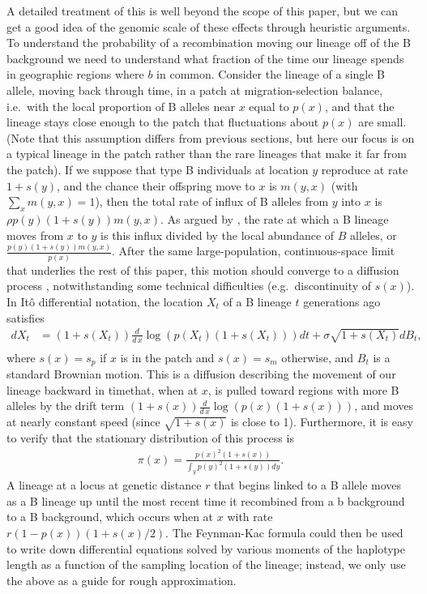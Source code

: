 \documentclass{article}
\begin{document}
A detailed treatment of this is well beyond the scope of this paper,
but we can get a good idea of the genomic scale of these effects through heuristic arguments.
To understand the probability of a recombination moving our lineage
off of the B background we need to understand what fraction of the
time our lineage spends in geographic regions where $b$ in common. 
Consider the lineage of a single B allele, moving back through time,
in a patch at migration-selection balance, 
i.e.\ with the local proportion of B alleles near $x$ equal to $p(x)$,
and that the lineage stays close enough to the patch 
that fluctuations about $p(x)$ are small. 
(Note that this assumption differs from
previous sections, but here our focus is on a typical lineage in the
patch rather than the rare lineages that make it far from the patch).
If we suppose that type B individuals at location $y$ reproduce at rate $1+s(y)$,
and the chance their offspring move to $x$ is $m(y,x)$ (with $\sum_x m(y,x)=1$),
then the total rate of influx of B alleles from $y$ into $x$ is $\rho p(y) (1+s(y)) m(y,x)$.
As argued by \citet{hudson}, the rate at which a B lineage moves from $x$ to $y$
is this influx divided by the local abundance of $B$ alleles,
or $\frac{ p(y) (1+s(y)) m(y,x) }{ p(x) }$.
After the same large-population, continuous-space limit that underlies the rest of this paper,
this motion should converge to a diffusion process \citep[as assumed by][]{hallatschek},
notwithstanding some technical difficulties (e.g.\ discontinuity of $s(x)$).
In It\^o differential notation, 
the location $X_t$ of a B lineage $t$ generations ago satisfies
\begin{align}
    d X_t &= (1+s(X_t)) \frac{d}{d\,x} \log( p(X_t) (1+s(X_t)) ) dt + \sigma \sqrt{1+s(X_t)} dB_t,\\
\end{align}
where $s(x)=s_p$ if $x$ is in the patch and $s(x)=s_m$ otherwise, 
and $B_t$ is a standard Brownian motion.
This is a diffusion describing the movement of our lineage backward in
timethat, when at $x$, 
is pulled toward regions with more B alleles
by the drift term $(1+s(x))\frac{d}{d\,x} \log( p(x) (1+s(x)) )$,
and moves at nearly constant speed (since $\sqrt{1+s(x)}$ is close to 1).
Furthermore, it is easy to verify that the stationary distribution of this process is
\begin{align}
  \pi(x) = \frac{ p(x)^2 (1+s(x)) }{ \int_y p(y)^2 (1+s(y)) dy } . \label{eqn:lineagestatdist}
\end{align}
A lineage at a locus at genetic distance $r$ that begins linked to a B allele
moves as a B lineage up until the most recent time
it recombined from a b background to a B background,
which occurs when at $x$ with rate $r (1-p(x)) (1+s(x)/2)$.
The Feynman-Kac formula could then be used to write down differential equations
solved by various moments of the haplotype length as a function of the sampling location of the lineage;
instead, we only use the above as a guide for rough approximation.
\end{document}
